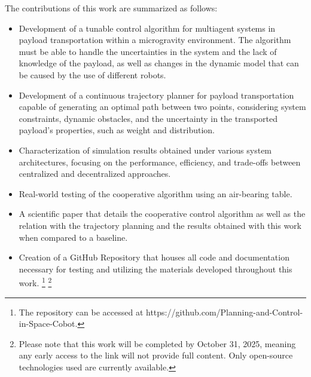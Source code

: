 The contributions of this work are summarized as follows:

\begin{itemize}
    \item Development of a tunable control algorithm for multiagent systems in payload transportation within a microgravity environment. The algorithm must be able to handle the uncertainties in the system and the lack of knowledge of the payload, as well as changes in the dynamic model that can be caused by the use of different robots.  
    \item Development of a continuous trajectory planner for payload transportation capable of generating an optimal path between two points, considering system constraints, dynamic obstacles, and the uncertainty in the transported payload's properties, such as weight and distribution. 
    \item Characterization of simulation results obtained under various system architectures, focusing on the performance, efficiency, and trade-offs between centralized and decentralized approaches.
    \item Real-world testing of the cooperative algorithm using an air-bearing table.
    \item A scientific paper that details the cooperative control algorithm as well as the relation with the trajectory planning and the results obtained with this work when compared to a baseline.
    \item Creation of a GitHub Repository that houses all code and documentation necessary for testing and utilizing the materials developed throughout this work. \footnote{The repository can be accessed at https://github.com/Planning-and-Control-in-Space-Cobot.} \footnote{Please note that this work will be completed by October 31, 2025, meaning any early access to the link will not provide full content. Only open-source technologies used are currently available.}
\end{itemize}